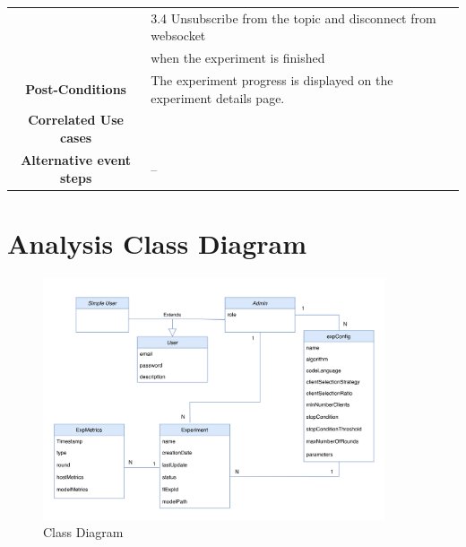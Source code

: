 \begin{table}[ht!]
\begin{tabularx}{\textwidth}{|Sl|S{X}|}
                                        & \hspace{1em} 3.4 Unsubscribe from the topic and disconnect from websocket \\ 
                                        & \hspace{1em} when the experiment is finished\\ \hline
        \textbf{Post-Conditions}       & The experiment progress is displayed on the experiment details page.          \\ \hline
        \textbf{Correlated Use cases}    &                                                                             \\ \hline
        \textbf{Alternative event steps} & --                                                                          \\ \hline
    \end{tabularx}
\end{table}

\newpage
\section{Analysis Class Diagram}

\begin{figure}[ht!]
    \centering
    \includegraphics[width=0.9\textwidth]{images/2_analisys/FL_class_diag.png}
    \caption{Class Diagram}
    \label{fig:class_diagram}
\end{figure}

\newpage
